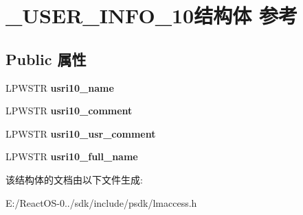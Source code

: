 \hypertarget{struct___u_s_e_r___i_n_f_o__10}{}\section{\+\_\+\+U\+S\+E\+R\+\_\+\+I\+N\+F\+O\+\_\+10结构体 参考}
\label{struct___u_s_e_r___i_n_f_o__10}
\subsection*{Public 属性}
\begin{DoxyCompactItemize}
\item 
\mbox{\label{struct___u_s_e_r___i_n_f_o__10_af017b8e888275b46fbdcedd59f3eaf8c}} 
L\+P\+W\+S\+TR {\bfseries usri10\+\_\+name}
\item 
\mbox{\label{struct___u_s_e_r___i_n_f_o__10_ab99f2f84bf6065cc4e04b27266c41d36}} 
L\+P\+W\+S\+TR {\bfseries usri10\+\_\+comment}
\item 
\mbox{\label{struct___u_s_e_r___i_n_f_o__10_a302746df7dfb09cc2270c78320846ab9}} 
L\+P\+W\+S\+TR {\bfseries usri10\+\_\+usr\+\_\+comment}
\item 
\mbox{\label{struct___u_s_e_r___i_n_f_o__10_a7ca622ac395a97253b642e9babac2393}} 
L\+P\+W\+S\+TR {\bfseries usri10\+\_\+full\+\_\+name}
\end{DoxyCompactItemize}


该结构体的文档由以下文件生成\+:\begin{DoxyCompactItemize}
\item 
E\+:/\+React\+O\+S-\/0../sdk/include/psdk/lmaccess.\+h\end{DoxyCompactItemize}
